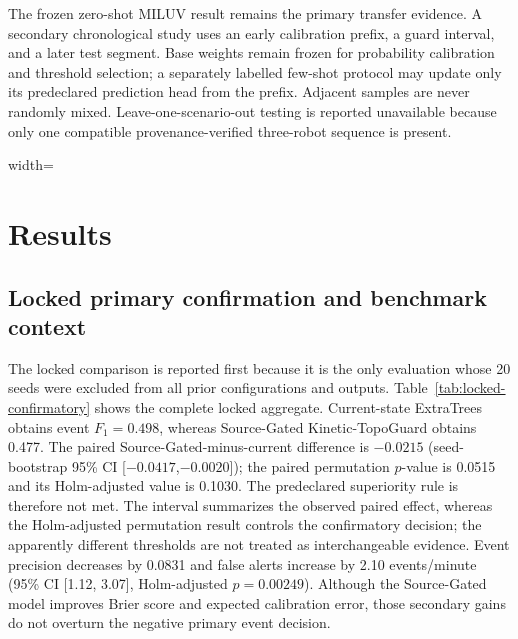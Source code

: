 \documentclass[final,5p,times,twocolumn]{elsarticle}
\begin{document}
The frozen zero-shot MILUV result remains the primary transfer evidence. A secondary
chronological study uses an early calibration prefix, a guard interval, and a later test
segment. Base weights remain frozen for probability calibration and threshold selection;
a separately labelled few-shot protocol may update only its predeclared prediction head
from the prefix. Adjacent samples are never randomly mixed. Leave-one-scenario-out testing
is reported unavailable because only one compatible provenance-verified three-robot
sequence is present.

\begin{table}[t]
\centering
\caption{External evidence matrix. Direct measurements are separated from derived or
transported quantities and their permitted interpretation.}
\label{tab:evidence-matrix}
\scriptsize
\begin{adjustbox}{width=\textwidth}

\end{adjustbox}
\end{table}

\section{Results}
\label{sec:results}

\subsection{Locked primary confirmation and benchmark context}

The locked comparison is reported first because it is the only evaluation whose 20 seeds
were excluded from all prior configurations and outputs. Table~\ref{tab:locked-confirmatory}
shows the complete locked aggregate. Current-state ExtraTrees obtains event $F_1=0.498$,
whereas Source-Gated Kinetic-TopoGuard obtains 0.477. The paired Source-Gated-minus-current
difference is $-0.0215$ (seed-bootstrap 95\% CI [$-0.0417$,$-0.0020$]); the paired
permutation $p$-value is 0.0515 and its Holm-adjusted value is 0.1030. The predeclared
superiority rule is therefore not met. The interval summarizes the observed paired
effect, whereas the Holm-adjusted permutation result controls the confirmatory decision;
the apparently different thresholds are not treated as interchangeable evidence. Event
precision decreases by 0.0831 and false alerts
increase by 2.10 events/minute (95\% CI [1.12, 3.07], Holm-adjusted $p=0.00249$).
Although the Source-Gated model improves Brier score and expected calibration error, those
secondary gains do not overturn the negative primary event decision.
\end{document}
